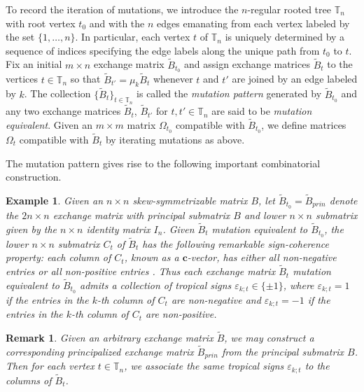 \documentclass{amsart}
\newtheorem{remark}[theorem]{Remark}
\newtheorem{example}[theorem]{Example}
\newcommand{\bfc}{\mathbf{c}}
\newcommand{\bfx}{\mathbf{x}}
\newcommand{\TT}{\mathbb{T}}
\begin{document}
To record the iteration of mutations, we introduce the $n$-regular rooted tree $\TT_n$ with root vertex $t_0$ and with the $n$ edges emanating from each vertex labeled by the set $\{1,\ldots,n\}$.
In particular, each vertex $t$ of $\TT_n$ is uniquely determined by a sequence of indices specifying the edge labels along the unique path from $t_0$ to $t$.
Fix an initial $m\times n$ exchange matrix $\tilde B_{t_0}$ and assign exchange matrices $\tilde B_t$ to the vertices $t\in\TT_n$ so that $\tilde B_{t'}=\mu_k\tilde B_t$ whenever $t$ and $t'$ are joined by an edge labeled by $k$.
The collection $\{\tilde B_t\}_{t\in\TT_n}$ is called the \emph{mutation pattern} generated by $\tilde B_{t_0}$ and any two exchange matrices $\tilde B_t$, $\tilde B_{t'}$ for $t,t'\in\TT_n$ are said to be \emph{mutation equivalent}.
Given an $m\times m$ matrix $\Omega_{t_0}$ compatible with $\tilde B_{t_0}$, we define matrices $\Omega_t$ compatible with $\tilde B_t$ by iterating mutations as above.

The mutation pattern gives rise to the following important combinatorial construction.
\begin{example}
  Given an $n\times n$ skew-symmetrizable matrix $B$, let $\tilde B_{t_0}=\tilde B_{prin}$ denote the $2n\times n$ exchange matrix with principal submatrix $B$ and lower $n\times n$ submatrix given by the $n\times n$ identity matrix $I_n$.
  Given $\tilde B_t$ mutation equivalent to $\tilde B_{t_0}$, the lower $n\times n$ submatrix $C_t$ of $\tilde B_t$ has the following remarkable \emph{sign-coherence} property: each column of $C_t$, known as a $\bfc$-vector, has either all non-negative entries or all non-positive entries \cite{fomin-zelevinsky4,nakanishi-zelevinsky,gross-hacking-keel-kontsevich}.
  Thus each exchange matrix $\tilde B_t$ mutation equivalent to $\tilde B_{t_0}$ admits a collection of \emph{tropical signs} $\varepsilon_{k;t}\in\{\pm1\}$, where $\varepsilon_{k;t}=1$ if the entries in the $k$-th column of $C_t$ are non-negative and $\varepsilon_{k;t}=-1$ if the entries in the $k$-th column of $C_t$ are non-positive. 
\end{example}

\begin{remark}
  Given an arbitrary exchange matrix $\tilde B$, we may construct a corresponding principalized exchange matrix $\tilde B_{prin}$ from the principal submatrix $B$.
  Then for each vertex $t\in\TT_n$, we associate the same tropical signs $\varepsilon_{k;t}$ to the columns of $\tilde B_t$.
\end{remark}
\end{document}
